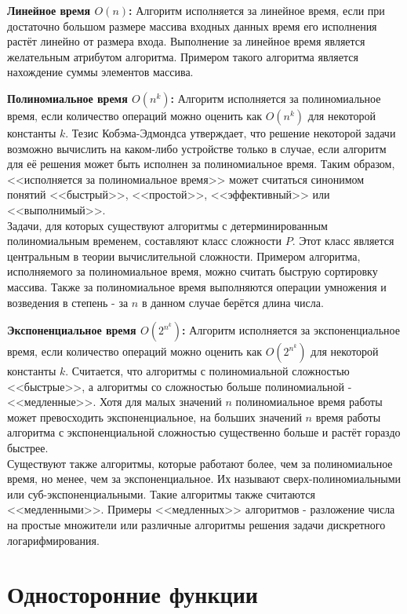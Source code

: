 \documentclass[times,specification,annotation]{itmo-student-thesis}
\begin{document}
\textbf{Линейное время $O(n)$:}
Алгоритм исполняется за линейное время, если при достаточно большом размере массива входных данных
время его исполнения растёт линейно от размера входа.
Выполнение за линейное время является желательным атрибутом алгоритма.
Примером такого алгоритма является нахождение суммы элементов массива.
\par

\textbf{Полиномиальное время $O(n^k)$:}
Алгоритм исполняется за полиномиальное время, если количество операций можно оценить как $O(n^k)$ для некоторой константы $k$.
Тезис Кобэма-Эдмондса утверждает, что решение некоторой задачи возможно вычислить на каком-либо устройстве только в случае,
если алгоритм для её решения может быть исполнен за полиномиальное время.
Таким образом, <<исполняется за полиномиальное время>> может считаться синонимом понятий <<быстрый>>, <<простой>>, <<эффективный>>
или <<выполнимый>>.\\
Задачи, для которых существуют алгоритмы с детерминированным полиномиальным временем, составляют класс сложности $P$.
Этот класс является центральным в теории вычислительной сложности.
Примером алгоритма, исполняемого за полиномиальное время, можно считать быструю сортировку массива.
Также за полиномиальное время выполняются операции умножения и возведения в степень - за $n$ в данном случае
берётся длина числа.
\par

\textbf{Экспоненциальное время $O(2^{n^k})$:}
Алгоритм исполняется за экспоненциальное время, если количество операций можно оценить как $O(2^{n^k})$ для некоторой константы $k$.
Считается, что алгоритмы с полиномиальной сложностью <<быстрые>>, а алгоритмы со сложностью больше полиномиальной - <<медленные>>.
Хотя для малых значений $n$ полиномиальное время работы может превосходить экспоненциальное, на больших
значений $n$ время работы алгоритма с экспоненциальной сложностью существенно больше и растёт гораздо
быстрее.\\
Существуют также алгоритмы, которые работают более, чем за полиномиальное время, но менее, чем за экспоненциальное.
Их называют сверх-полиномиальными или суб-экспоненциальными.
Такие алгоритмы также считаются <<медленными>>.
Примеры <<медленных>> алгоритмов - разложение числа на простые множители или различные алгоритмы решения задачи
дискретного логарифмирования.
\par


\section{Односторонние функции}\label{sec:func}
\end{document}

